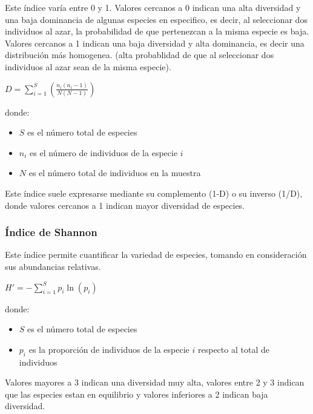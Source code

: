Este índice varía entre 0 y 1.  
Valores cercanos a 0 indican una alta diversidad y una baja dominancia de algunas especies en especifico, es decir, al seleccionar dos individuos al azar, la probabilidad de que pertenezcan a la misma especie es baja. 
Valores cercanos a 1 indican una baja diversidad y alta dominancia, es decir una distribución más homogenea. (alta probablidad de que al seleccionar dos individuos al azar sean de la misma especie).
\begin{center}
\begin{math}
D = \sum_{i=1}^{S} \left( \frac{n_i (n_i - 1)}{N (N - 1)} \right)
\end{math}
\end{center}

donde: 
\begin{itemize}
    \item $S$ es el número total de especies
    \item $n_i$ es el número de individuos de la especie $i$
    \item $N$ es el número total de individuos en la muestra
\end{itemize}
Este índice suele expresarse mediante su complemento (1-D) o su inverso (1/D), donde valores cercanos a 1 indican mayor diversidad de especies.

\subsubsection{Índice de Shannon}
Este índice permite cuantificar la variedad de especies, tomando en consideración sus abundancias relativas.

\begin{center}
    \begin{math}
H' = - \sum_{i=1}^{S} p_i \ln(p_i)
\end{math}
\end{center}
donde:
\begin{itemize}
    \item $S$ es el número total de especies
    \item $p_i$ es la proporción de individuos de la especie $i$ respecto al total de individuos
\end{itemize}


Valores mayores a 3 indican una diversidad muy alta, valores entre 2 y 3 indican que las especies estan en equilibrio y valores inferiores a 2 indican baja diversidad.
